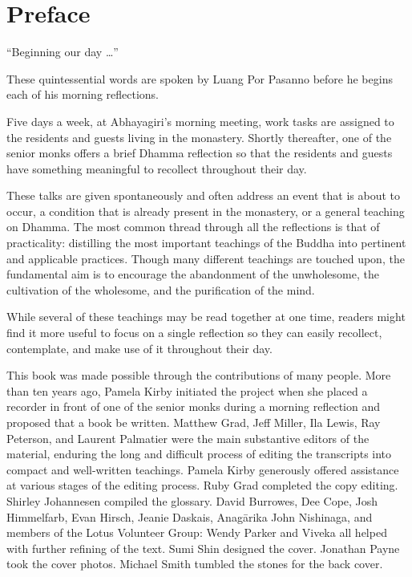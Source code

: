 \chapter*{Preface}

``Beginning our day \ldots{}''

These quintessential words are spoken by Luang Por Pasanno before he
begins each of his morning reflections.

Five days a week, at Abhayagiri's morning meeting, work tasks are
assigned to the residents and guests living in the monastery. Shortly
thereafter, one of the senior monks offers a brief Dhamma reflection so
that the residents and guests have something meaningful to recollect
throughout their day.

These talks are given spontaneously and often address an event that is
about to occur, a condition that is already present in the monastery, or
a general teaching on Dhamma. The most common thread through all the
reflections is that of practicality: distilling the most important
teachings of the Buddha into pertinent and applicable practices. Though
many different teachings are touched upon, the fundamental aim is to
encourage the abandonment of the unwholesome, the cultivation of the
wholesome, and the purification of the mind.

While several of these teachings may be read together at one time,
readers might find it more useful to focus on a single reflection so
they can easily recollect, contemplate, and make use of it throughout
their day.

This book was made possible through the contributions of many people.
More than ten years ago, Pamela Kirby initiated the project when she
placed a recorder in front of one of the senior monks during a morning
reflection and proposed that a book be written. Matthew Grad, Jeff
Miller, Ila Lewis, Ray Peterson, and Laurent Palmatier were the main
substantive editors of the material, enduring the long and difficult
process of editing the transcripts into compact and well-written
teachings. Pamela Kirby generously offered assistance at various stages
of the editing process. Ruby Grad completed the copy editing. Shirley
Johannesen compiled the glossary. David Burrowes, Dee Cope, Josh
Himmelfarb, Evan Hirsch, Jeanie Daskais, Anagārika John Nishinaga, and
members of the Lotus Volunteer Group: Wendy Parker and Viveka all helped
with further refining of the text. Sumi Shin designed the cover.
Jonathan Payne took the cover photos. Michael Smith tumbled the stones
for the back cover.

